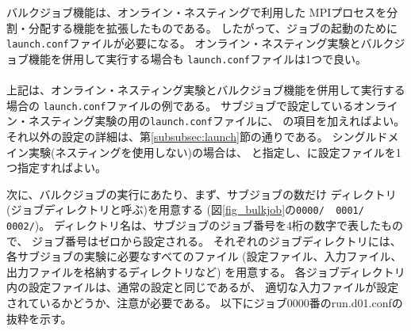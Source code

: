 バルクジョブ機能は、オンライン・ネスティングで利用した
MPIプロセスを分割・分配する機能を拡張したものである。
したがって、ジョブの起動のために\verb|launch.conf|ファイルが必要になる。
オンライン・ネスティング実験とバルクジョブ機能を併用して実行する場合も
\verb|launch.conf|ファイルは1つで良い。\\

\\

\noindent 上記は、オンライン・ネスティング実験とバルクジョブ機能を併用して実行する場合の
\verb|launch.conf|ファイルの例である。
サブジョブで設定しているオンライン・ネスティング実験の用の\verb|launch.conf|ファイルに、
の項目を加えればよい。
それ以外の設定の詳細は、第\ref{subsubsec:launch}節の通りである。
シングルドメイン実験(ネスティングを使用しない)の場合は、
と指定し、に設定ファイルを1つ指定すればよい。


次に、バルクジョブの実行にあたり、まず、サブジョブの数だけ
ディレクトリ(ジョブディレクトリと呼ぶ)を用意する
(図\ref{fig_bulkjob}の\verb|0000/  0001/  0002/|)。
ディレクトリ名は、サブジョブのジョブ番号を4桁の数字で表したもので、
ジョブ番号はゼロから設定される。
それぞれのジョブディレクトリには、各サブジョブの実験に必要なすべてのファイル
(設定ファイル、入力ファイル、出力ファイルを格納するディレクトリなど) を用意する。
%
各ジョブディレクトリ内の設定ファイルは、通常の設定と同じであるが、
適切な入力ファイルが設定されているかどうか、注意が必要である。
以下にジョブ0000番のrun.d01.confの抜粋を示す。\\



